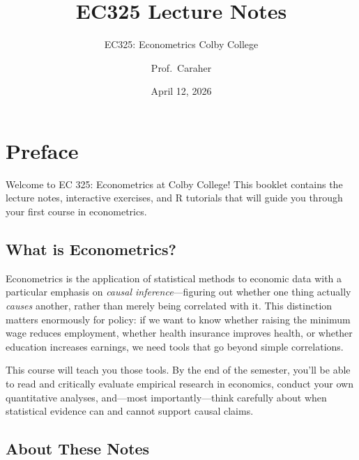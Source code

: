 \documentclass[
  letterpaper,
  DIV=11,
  numbers=noendperiod]{scrreprt}
\title{EC325 Lecture Notes}
\subtitle{EC325: Econometrics \textbar{} Colby College}
\author{Prof.~Caraher}
\date{April 12, 2026}
\renewcommand*\contentsname{Table of contents}
\newcommand\contentsname{Table of contents}
\begin{document}
\maketitle

\renewcommand*\contentsname{Table of contents}
{
\setcounter{tocdepth}{2}
\tableofcontents
}


\chapter*{Preface}\label{preface}


Welcome to EC 325: Econometrics at Colby College! This booklet contains
the lecture notes, interactive exercises, and R tutorials that will
guide you through your first course in econometrics.

\section*{What is Econometrics?}\label{what-is-econometrics}


Econometrics is the application of statistical methods to economic data
with a particular emphasis on \emph{causal inference}---figuring out
whether one thing actually \emph{causes} another, rather than merely
being correlated with it. This distinction matters enormously for
policy: if we want to know whether raising the minimum wage reduces
employment, whether health insurance improves health, or whether
education increases earnings, we need tools that go beyond simple
correlations.

This course will teach you those tools. By the end of the semester,
you'll be able to read and critically evaluate empirical research in
economics, conduct your own quantitative analyses, and---most
importantly---think carefully about when statistical evidence can and
cannot support causal claims.

\section*{About These Notes}\label{about-these-notes}

\end{document}
